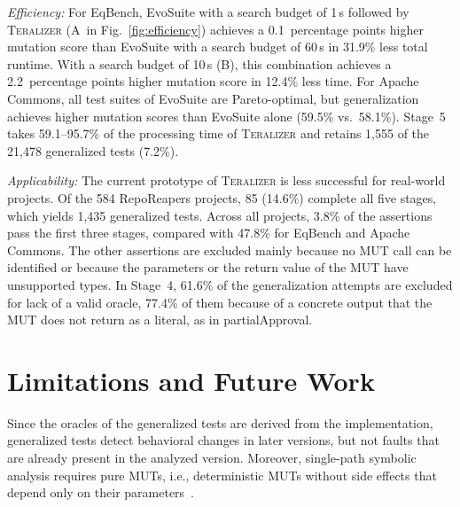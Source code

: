\documentclass[10pt,conference]{IEEEtran}
\newcommand{\Teralizer}{\textsc{Teralizer}}
\newcommand{\codefont}{\fontfamily{lmtt}\selectfont}
\newcommand{\code}[1]{{\codefont #1}}
\newcommand{\runin}[1]{\textit{#1:}}
\begin{document}
\runin{Efficiency}
For EqBench, EvoSuite with a search budget of 1\,s followed by \Teralizer{} (A~in Fig.~\ref{fig:efficiency}) achieves a 0.1~percentage points higher mutation score than EvoSuite with a search budget of 60\,s in 31.9\% less total runtime.
With a search budget of 10\,s (B), this combination achieves a 2.2~percentage points higher mutation score in 12.4\% less time.
For Apache Commons, all test suites of EvoSuite are Pareto-optimal, but generalization achieves higher mutation scores than EvoSuite alone (59.5\% vs.\ 58.1\%).
Stage~5 takes 59.1--95.7\% of the processing time of \Teralizer{} and retains 1,555 of the 21,478 generalized tests (7.2\%).

\runin{Applicability}
The current prototype of \Teralizer{} is less successful for real-world projects.
Of the 584 RepoReapers projects, 85 (14.6\%) complete all five stages, which yields 1,435 generalized tests.
Across all projects, 3.8\% of the assertions pass the first three stages, compared with 47.8\% for EqBench and Apache Commons.
The other assertions are excluded mainly because no MUT call can be identified or because the parameters or the return value of the MUT have unsupported types.
In Stage~4, 61.6\% of the generalization attempts are excluded for lack of a valid oracle, 77.4\% of them because of a concrete output that the MUT does not return as a literal, as in \code{partialApproval}.

\section{Limitations and Future Work}
\label{sec:outlook}

Since the oracles of the generalized tests are derived from the implementation, generalized tests detect behavioral changes in later versions, but not faults that are already present in the analyzed version.
Moreover, single-path symbolic analysis requires pure MUTs, i.e., deterministic MUTs without side effects that depend only on their parameters~\cite{glock_2025_teralizer}.
\end{document}
